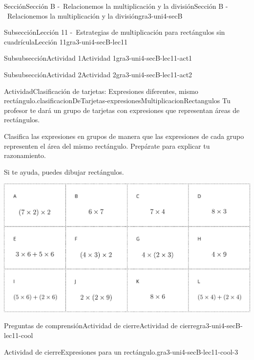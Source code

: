 \documentclass[twoside,10pt,]{article}
\begin{document}
\begin{sectionptx}{Sección}{Sección B -~Relacionemos la multiplicación y la división}{}{Sección B -~Relacionemos la multiplicación y la división}{}{}{gra3-uni4-secB}
\begin{subsectionptx}{Subsección}{Lección 11 -~Estrategias de multiplicación para rectángulos sin cuadrícula}{}{Lección 11}{}{}{gra3-uni4-secB-lec11}
\begin{subsubsectionptx}{Subsubsección}{Actividad 1}{}{Actividad 1}{}{}{gra3-uni4-secB-lec11-act1}
\end{subsubsectionptx}
%
%
\typeout{************************************************}
\typeout{************************************************}
%
\begin{subsubsectionptx}{Subsubsección}{Actividad 2}{}{Actividad 2}{}{}{gra3-uni4-secB-lec11-act2}
\begin{activity}{Actividad}{Clasificación de tarjetas: Expresiones diferentes, mismo rectángulo.}{clasificacionDeTarjetas-expresionesMultiplicacionRectangulos}%
Tu profesor te dará un grupo de tarjetas con expresiones que representan áreas de rectángulos.%
\par
Clasifica las expresiones en grupos de manera que las expresiones de cada grupo representen el área del mismo rectángulo. Prepárate para explicar tu razonamiento.%
\par
Si te ayuda, puedes dibujar rectángulos.%
\begin{image}{0.25}{0.5}{0.25}{}%
\includegraphics[width=\linewidth]{external/png-source/Card Sort Different Expressions, Same Rectangle for Screenshot Only.png}
\end{image}%
\end{activity}%
\end{subsubsectionptx}
%
%
\typeout{************************************************}
\typeout{************************************************}
%
\begin{reading-questions-subsubsection}{Preguntas de comprensión}{Actividad de cierre}{}{Actividad de cierre}{}{}{gra3-uni4-secB-lec11-cool}
\begin{project}{Actividad de cierre}{Expresiones para un rectángulo.}{gra3-uni4-secB-lec11-cool-3}%
\begin{sidebyside}{2}{0}{0}{0}%
\begin{sbspanel}{0.6}%

\end{sbspanel}
\end{sidebyside}
\end{project}
\end{reading-questions-subsubsection}
\end{subsectionptx}
\end{sectionptx}
\end{document}
